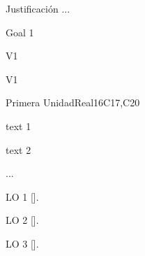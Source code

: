 \begin{syllabus}


\begin{justification}
Justificación ...
\end{justification}

\begin{goals}
\item Goal 1
\end{goals}

\begin{outcomes}{V1}
   \item {}
   \item {}
   \item {}
\end{outcomes}

\begin{competences}{V1}
    \item {}
    \item {}
    \item {}
\end{competences}

\begin{unit}{}{Primera Unidad}{Real}{16}{C17,C20}
\begin{topics}
      \item text 1
      \item text 2
      \item ...
\end{topics}

\begin{learningoutcomes}
   \item LO 1 [\Usage].
   \item LO 2 [\Usage].
   \item LO 3 [\Usage].
\end{learningoutcomes}
\end{unit}

\begin{coursebibliography}
\end{coursebibliography}

\end{syllabus}
